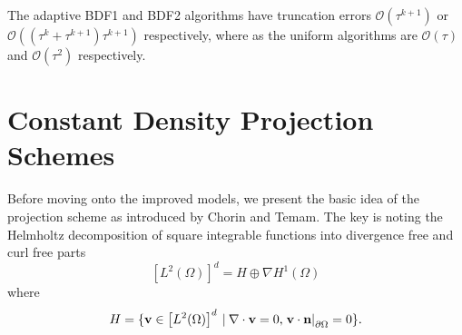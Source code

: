 \documentclass[letterpaper]{erdc}
\begin{document}
The adaptive BDF1 and BDF2 algorithms have truncation errors $\mathcal{O}\left(\tau^{k+1}\right)$ or $\mathcal{O}\left(\left(\tau^{k}+\tau^{k+1} \right)\tau^{k+1} \right)$ respectively, where as the uniform algorithms are $\mathcal{O}(\tau)$ and $\mathcal{O}(\tau^{2})$ respectively.
  

%
%
%
\section{Constant Density Projection Schemes}
Before moving onto the improved models, we present the basic idea of the projection scheme as introduced by Chorin and Temam.  The key is noting the Helmholtz decomposition of square integrable functions into divergence free and curl free parts
\begin{equation}
\left[ L^2(\Omega)\right]^d = H \oplus \nabla H^1(\Omega)
\end{equation}
where
\begin{equation}
H = \{ \textbf{v}\in \left[ L^2(\Omega)\right]^d \:|\: \nabla\cdot \textbf{v} = 0, \left.\textbf{v}\cdot\textbf{n} \right|_{\partial\Omega} = 0  \}.
\end{equation}
\end{document}
